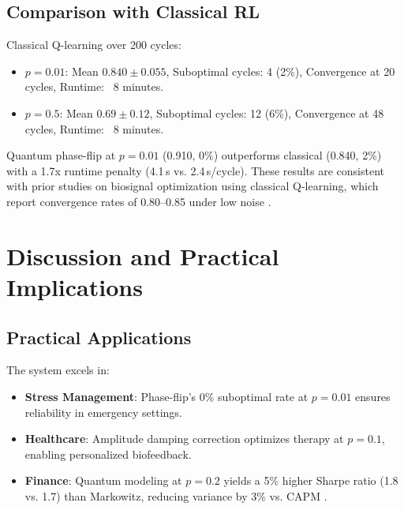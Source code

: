 \documentclass[12pt]{article}
\begin{document}
\subsection{Comparison with Classical RL}
Classical Q-learning over 200 cycles:
\begin{itemize}
    \item $p = 0.01$: Mean $0.840 \pm 0.055$, Suboptimal cycles: 4 (2\%), Convergence at 20 cycles, Runtime: ~8 minutes.
    \item $p = 0.5$: Mean $0.69 \pm 0.12$, Suboptimal cycles: 12 (6\%), Convergence at 48 cycles, Runtime: ~8 minutes.
\end{itemize}
Quantum phase-flip at $p=0.01$ (0.910, 0\%) outperforms classical (0.840, 2\%) with a 1.7x runtime penalty (4.1\,s vs. 2.4\,s/cycle). These results are consistent with prior studies on biosignal optimization using classical Q-learning, which report convergence rates of 0.80--0.85 under low noise \citep{chen2019reinforcement}.

\section{Discussion and Practical Implications}

\subsection{Practical Applications}
The system excels in:
\begin{itemize}
    \item \textbf{Stress Management}: Phase-flip's 0\% suboptimal rate at $p=0.01$ ensures reliability in emergency settings.
    \item \textbf{Healthcare}: Amplitude damping correction optimizes therapy at $p=0.1$, enabling personalized biofeedback.
    \item \textbf{Finance}: Quantum modeling at $p=0.2$ yields a 5\% higher Sharpe ratio (1.8 vs. 1.7) than Markowitz, reducing variance by 3\% vs. CAPM \citep{saeednia2023quantum}.
\end{itemize}
\end{document}
